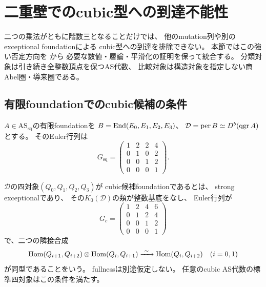 \section{二重壁でのcubic型への到達不能性}
\label{sec:qa-as-cubic-obstruction}

二つの乗法がともに階数三となることだけでは、
他のmutation列や別のexceptional foundationによる
cubic型への到達を排除できない。
本節ではこの強い否定方向を
\cite[第19--21節]{AvatarVSeven2026}から
必要な数値・層論・平滑化の証明を保って統合する。
分類対象は引き続き全整数頂点を保つAS代数、
比較対象は構造対象を指定しない商Abel圏・導来圏である。

\subsection{有限foundationでのcubic候補の条件}
\label{subsec:qa-as-cubic-candidate}

$A\in\mathrm{AS}_{\mathrm{sq}}$の有限foundationを
$B=\operatorname{End}(E_0,E_1,E_2,E_3)$、
$\mathcal D=\operatorname{per}B\simeq D^b(\operatorname{qgr} A)$とする。
そのEuler行列は
\[
G_{\mathrm{sq}}=
\begin{pmatrix}
1&2&2&4\\0&1&0&2\\0&0&1&2\\0&0&0&1
\end{pmatrix}.
\]
\begin{definition}[cubic候補foundation]
\label{def:qa-as-cubic-candidate}
$\mathcal D$の四対象$(Q_0,Q_1,Q_2,Q_3)$が
cubic候補foundationであるとは、
strong exceptionalであり、
その$K_0(\mathcal D)$の類が整数基底をなし、
Euler行列が
\[
G_c=
\begin{pmatrix}
1&2&4&6\\0&1&2&4\\0&0&1&2\\0&0&0&1
\end{pmatrix}
\]
で、二つの隣接合成
\begin{equation}
\operatorname{Hom}(Q_{i+1},Q_{i+2})\otimes\operatorname{Hom}(Q_i,Q_{i+1})
\xrightarrow{\ \sim\ }\operatorname{Hom}(Q_i,Q_{i+2})
\quad(i=0,1)
\label{eq:qa-as-cubic-two-compositions}
\end{equation}
が同型であることをいう。
fullnessは別途仮定しない。
任意のcubic AS代数の標準四対象はこの条件を満たす。
\end{definition}

